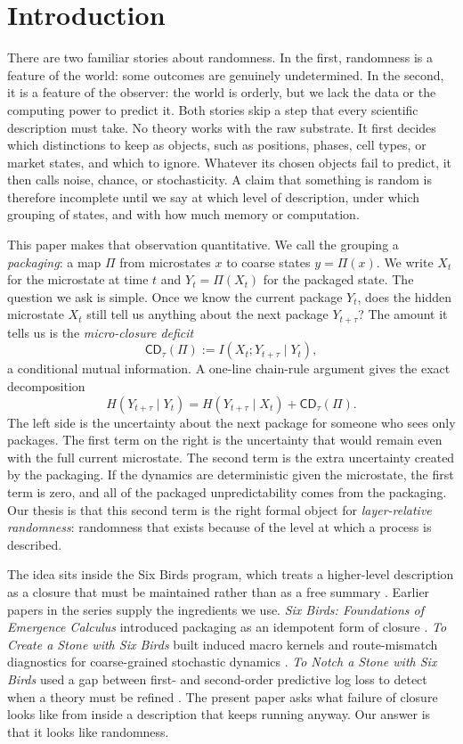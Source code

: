 \section{Introduction}\label{sec:intro}

There are two familiar stories about randomness. In the first, randomness is a feature of the world: some outcomes are genuinely undetermined. In the second, it is a feature of the observer: the world is orderly, but we lack the data or the computing power to predict it. Both stories skip a step that every scientific description must take. No theory works with the raw substrate. It first decides which distinctions to keep as objects, such as positions, phases, cell types, or market states, and which to ignore. Whatever its chosen objects fail to predict, it then calls noise, chance, or stochasticity. A claim that something is random is therefore incomplete until we say at which level of description, under which grouping of states, and with how much memory or computation.

This paper makes that observation quantitative. We call the grouping a \emph{packaging}: a map $\Pi$ from microstates $x$ to coarse states $y=\Pi(x)$. We write $X_t$ for the microstate at time $t$ and $Y_t=\Pi(X_t)$ for the packaged state. The question we ask is simple. Once we know the current package $Y_t$, does the hidden microstate $X_t$ still tell us anything about the next package $Y_{t+\tau}$? The amount it tells us is the \emph{micro-closure deficit}
\[
\mathsf{CD}_\tau(\Pi) := I(X_t; Y_{t+\tau} \mid Y_t),
\]
a conditional mutual information. A one-line chain-rule argument gives the exact decomposition
\[
H(Y_{t+\tau}\mid Y_t)
=
H(Y_{t+\tau}\mid X_t)
+
\mathsf{CD}_\tau(\Pi).
\]
The left side is the uncertainty about the next package for someone who sees only packages. The first term on the right is the uncertainty that would remain even with the full current microstate. The second term is the extra uncertainty created by the packaging. If the dynamics are deterministic given the microstate, the first term is zero, and all of the packaged unpredictability comes from the packaging. Our thesis is that this second term is the right formal object for \emph{layer-relative randomness}: randomness that exists because of the level at which a process is described.

The idea sits inside the Six Birds program, which treats a higher-level description as a closure that must be maintained rather than as a free summary \citep{tsiokos2026sixbirds}. Earlier papers in the series supply the ingredients we use. \emph{Six Birds: Foundations of Emergence Calculus} introduced packaging as an idempotent form of closure \citep{tsiokos2026sixbirds}. \emph{To Create a Stone with Six Birds} built induced macro kernels and route-mismatch diagnostics for coarse-grained stochastic dynamics \citep{tsiokos2026pica}. \emph{To Notch a Stone with Six Birds} used a gap between first- and second-order predictive log loss to detect when a theory must be refined \citep{tsiokos2026notch}. The present paper asks what failure of closure looks like from inside a description that keeps running anyway. Our answer is that it looks like randomness.

